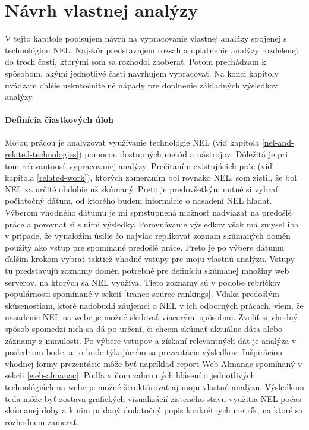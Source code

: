 \chapter{Návrh vlastnej analýzy}
\label{possible-analysis-strategies}


V tejto kapitole popisujem návrh na vypracovanie vlastnej analázy spojenej s technológiou NEL.
Najskôr predstavujem rozsah a uplatnenie analýzy rozdelenej do troch častí, ktorými som sa rozhodol zaoberať.
Potom prechádzam k spôsobom, akými jednotlivé časti navrhujem vypracovať.
Na konci kapitoly uvádzam ďalšie uskutočniteľné nápady pre doplnenie základných výsledkov analýzy.

\subsubsection{Definícia čiastkových úloh}

Mojou prácou je analyzovať využívanie technológie NEL (viď kapitola \ref{nel-and-related-technologies}) pomocou dostupných metód a nástrojov.
Dôležitá je pri tom relevantnosť vypracovanej analýzy.
Prečítaním existujúcich prác (viď kapitola \ref{related-work}), ktorých zameraním bol rovnako NEL, som zistil, že bol NEL za určité obdobie už skúmaný.
Preto je predovšetkým nutné si vybrať počiatočný dátum, od ktorého budem informácie o nasadení NEL hľadať. 
Výberom vhodného dátumu je mi sprístupnená možnosť nadviazať na predošlé práce a porovnať si s nimi výsledky.
Porovnávanie výsledkov však má zmysel iba v prípade, že vynaložím úsilie čo najviac replikovať zoznam skúmaných domén použitý ako vstup pre spomínané predošlé práce.
Preto je po výbere dátumu ďalším krokom vybrať taktiež vhodné vstupy pre moju vlastnú analýzu.
Vstupy tu predstavujú zoznamy domén potrebné pre definíciu skúmanej množiny web serverov, na ktorých sa NEL využíva.
Tieto zoznamy sú v podobe rebríčkov populárnosti spomínané v sekcií \ref{tranco-source-rankings}.
Vďaka predošlým skúsenostiam, ktoré nadobudli záujemci o NEL v ich odborných prácach, viem, že nasadenie NEL na webe je možné sledovať viacerými spôsobmi.
Zvoliť si vhodný spôsob spomedzi nich sa dá po určení, či chcem skúmať aktuálne dáta alebo záznamy z minulosti.
Po výbere vstupov a získaní relevantných dát je analýza v poslednom bode, a to bode týkajúceho sa prezentácie výsledkov.
Inšpiráciou vhodnej formy prezentácie môže byť napríklad report Web Almanac spomínaný v sekcii \ref{web-almanac}.
Podľa v ňom zahrnutých hlásení o jednotlivých technológiách na webe je možné štruktúrovať aj moju vlastnú analýzu.
Výsledkom teda môže byť zostava grafických vizualizácií zisteného stavu využitia NEL počas skúmanej doby a k nim pridaný dodatočný popis konkrétnych metrík, na ktoré sa rozhodnem zamerať.

